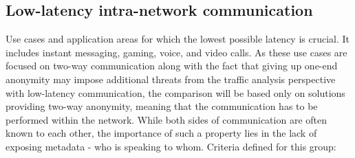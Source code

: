 \subsection{Low-latency intra-network communication}
Use cases and application areas for which the lowest possible latency is crucial. It includes instant messaging, gaming, voice, and video calls.
As these use cases are focused on two-way communication along with the fact that giving up one-end anonymity may impose additional threats from the traffic analysis perspective with low-latency communication, the comparison will be based only on solutions providing two-way anonymity, meaning that the communication has to be performed within the network. While both sides of communication are often known to each other, the importance of such a property lies in the lack of exposing metadata - who is speaking to whom.
Criteria defined for this group:
